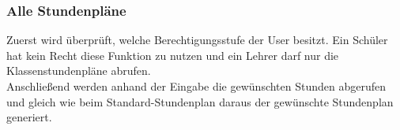 \subsubsection{Alle Stundenpläne}
Zuerst wird überprüft, welche Berechtigungsstufe der User besitzt. Ein Schüler hat kein Recht diese Funktion zu nutzen und ein Lehrer darf nur die Klassenstundenpläne abrufen.\\
Anschließend werden anhand der Eingabe die gewünschten Stunden abgerufen und gleich wie beim Standard-Stundenplan daraus der gewünschte Stundenplan generiert.